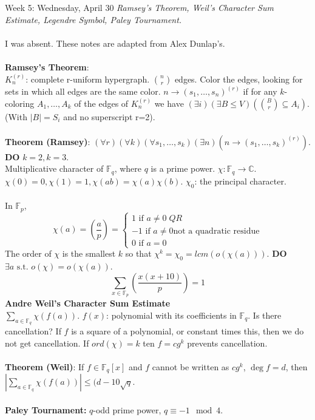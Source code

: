 \documentclass[12pt]{article}
\theoremstyle{remark}
\newcommand{\F}{\mathbb{F}}
\newcommand{\C}{\mathbb{C}}
\newcommand{\st}{\text{ s.t. }}
\newcommand{\IF}{\text{ if }}
\begin{document}
\label{14}\begin{section}{Week 5: Wednesday, April 30}
\indent\textit{Ramsey's Theorem, Weil's Character Sum Estimate, Legendre Symbol, Paley Tournament.}\\\\
I was absent. These notes are adapted from Alex Dunlap's.
\\\\
\textbf{Ramsey's Theorem}: 
\\$K_n^{(r)}$: complete r-uniform hypergraph. ${n \choose r}$ edges. Color the edges, looking for sets in which all edges are the same color. $n \to (s_1,\ldots,s_n)^(r)$ if for any $k$-coloring $A_1,\ldots,A_k$ of the edges of $K_n^{(r)}$ we have $(\exists i)(\exists B \leq V)({B \choose r} \subseteq A_i)$. (With $|B| = S_i$ and no superscript r=2).
\\\\
\textbf{Theorem (Ramsey)}: $(\forall r)(\forall k)(\forall s_1,\ldots,s_k)(\exists n)(n \to (s_1,\ldots,s_k)^{(r)})$.
\\\textbf{DO} $k=2,k=3$.
\\
Multiplicative character of $\F_q$, where $q$ is a prime power. $\chi: \F_q \to \C$. $\chi(0) = 0, \chi(1) = 1, \chi(ab)=\chi(a)\chi(b)$. $\chi_0$: the principal character.
\\\\
In $\F_p$, $$\chi(a) = \left(\frac a p \right) =
\begin{cases} 1 \IF a \neq 0\; QR
\\
-1 \IF a \neq 0 \text{not a quadratic residue}\\
0 \IF a = 0
\end{cases}
$$
The order of $\chi$ is the smallest $k$ so that $\chi^k = \chi_0 = lcm(o(\chi(a)))$. \textbf{DO} $\exists a \st o(\chi) = o(\chi(a))$.
$$\sum_{x \in \F_p} \left(\frac{x(x+10)}{p}\right) = 1$$
\textbf{Andre Weil's Character Sum Estimate}
\\
$\sum_{a \in \F_q} \chi(f(a))$. $f(x)$: polynomial with its coefficients in $\F_q$. Is there cancellation? If $f$ is a square of a polynomial, or constant times this, then we do not get cancellation. If $ord(\chi) = k$ ten $f = cg^k$ prevents cancellation.
\\\\
\textbf{Theorem (Weil)}: If $f \in \F_q[x]$ and $f$ cannot be written as $cg^k$, $\deg f = d$, then $|\sum_{a \in \F_q} \chi(f(a)) | \leq (d-10 \sqrt{q}$.
\\\\
\textbf{Paley Tournament:} $q$-odd prime power, $q \equiv -1 \mod 4$. 

\end{section}
\end{document}
